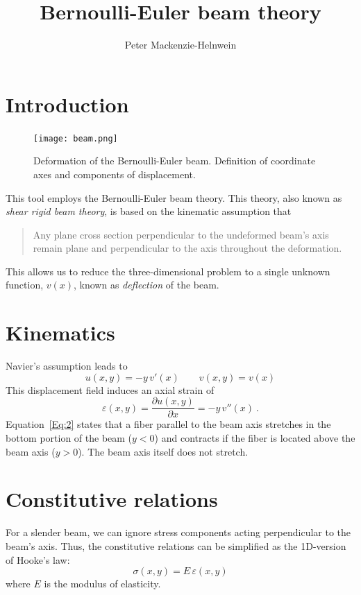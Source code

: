 \documentclass[11pt, oneside]{article}   	%
\title{Bernoulli-Euler beam theory}
\author{Peter Mackenzie-Helnwein}
\begin{document}
\maketitle

\tableofcontents

\section{Introduction}
\begin{figure}[h]
	\begin{center}
		\texttt{[image: beam.png]}
		\caption{Deformation of the Bernoulli-Euler beam. Definition of coordinate axes and components of displacement.}
	\end{center}
	\label{Fig:1}
\end{figure}
This tool employs the Bernoulli-Euler beam theory.  This theory, also known as \emph{shear rigid beam theory}, is based on the kinematic assumption  that
\begin{quote}
   Any plane cross section perpendicular to the undeformed beam's axis remain plane and perpendicular to the axis throughout the deformation.
\end{quote}
This allows us to reduce the three-dimensional problem to a single unknown function, $v(x)$, known as \emph{deflection} of the beam.

\section{Kinematics}
Navier's assumption leads to
\begin{equation}
	u(x,y) = -y \,v'(x)
	\qquad
	v(x,y) = v(x)
	\label{Eq:1}
\end{equation}
This displacement field induces an axial strain of
\begin{equation}
	\varepsilon(x,y) = \frac{\partial u(x,y)}{\partial x} = -y\, v''(x) ~.
	\label{Eq:2}
\end{equation}
Equation~\eqref{Eq:2} states that a fiber parallel to the beam axis stretches in the bottom portion of the beam ($y<0$) and contracts if the fiber is located above the beam axis ($y>0$).  The beam axis itself  does not stretch.

\section{Constitutive relations}
For a slender beam, we can ignore stress components acting perpendicular to the beam's axis.  Thus, the constitutive relations can be simplified as the 1D-version of Hooke's law:
\begin{equation}
	\sigma(x,y) = E\,\varepsilon(x,y)
	\label{Eq:3}
\end{equation}
where $E$ is the modulus of elasticity.
\end{document}
